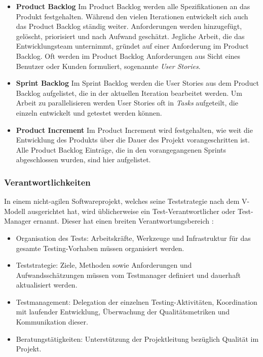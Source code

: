 \begin{itemize}
\item \textbf{Product Backlog} Im Product Backlog werden alle Spezifikationen an das Produkt festgehalten. Während den vielen Iterationen entwickelt sich auch das Product Backlog ständig weiter. Anforderungen werden hinzugefügt, gelöscht, priorisiert und nach Aufwand geschätzt. Jegliche Arbeit, die das Entwicklungsteam unternimmt, gründet auf einer Anforderung im Product Backlog. Oft werden im Product Backlog Anforderungen aus Sicht eines Benutzer oder Kunden formuliert, sogenannte \textit{User Stories}.
\item \textbf{Sprint Backlog} Im Sprint Backlog werden die User Stories aus dem Product Backlog aufgelistet, die in der aktuellen Iteration bearbeitet werden. Um Arbeit zu parallelisieren werden User Stories oft in \textit{Tasks} aufgeteilt, die einzeln entwickelt und getestet werden können.
\item \textbf{Product Increment} Im Product Increment wird festgehalten, wie weit die Entwicklung des Produkts über die Dauer des Projekt vorangeschritten ist. Alle Product Backlog Einträge, die in den vorangegangenen Sprints abgeschlossen wurden, sind hier aufgelistet.
\end{itemize}


\subsubsection{Verantwortlichkeiten}
In einem nicht-agilen Softwareprojekt, welches seine Teststrategie nach dem V-Modell ausgerichtet hat, wird üblicherweise ein Test-Verantwortlicher oder Test-Manager ernannt. Dieser hat einen breiten Verantwortungsbereich \cite{linz_testing_2014}:

\begin{itemize}
\item Organisation des Tests: Arbeitskräfte, Werkzeuge und Infrastruktur für das gesamte Testing-Vorhaben müssen organisiert werden.
\item Teststrategie: Ziele, Methoden sowie Anforderungen und Aufwandsschätzungen müssen vom Testmanager definiert und dauerhaft aktualisiert werden.
\item Testmanagement: Delegation der einzelnen Testing-Aktivitäten, Koordination mit laufender Entwicklung, Überwachung der Qualitätsmetriken und Kommunikation dieser.
\item Beratungstätigkeiten: Unterstützung der Projektleitung bezüglich Qualität im Projekt.
\end{itemize}

